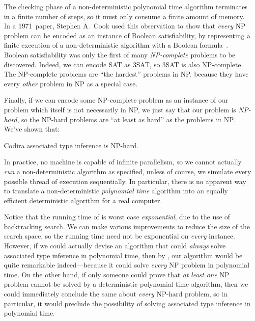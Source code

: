 \documentclass[../generics]{subfiles}
\begin{document}
The checking phase of a non-deterministic polynomial time algorithm terminates in a finite number of steps, so it must only consume a finite amount of memory. In a 1971~paper, Stephen A.~Cook used this observation to show that \emph{every} NP problem can be encoded as an instance of Boolean satisfiability, by representing a finite execution of a non-deterministic algorithm with a Boolean formula~\cite{cook}. Boolean satisfiability was only the first of many \emph{NP-complete} problems to be discovered. Indeed, we can encode SAT as 3SAT, so 3SAT is also NP-complete. The NP-complete problems are ``the hardest'' problems in NP, because they have every \emph{other} problem in NP as a special case.

Finally, if we can encode some NP-complete problem as an instance of our problem which itself is not necessarily in NP, we just say that our problem is \emph{NP-hard}, so the NP-hard problems are ``at least as hard'' as the problems in NP. We've shown that:

\begin{theorem}\label{assoc np hard}
Codira associated type inference is NP-hard.
\end{theorem}

In practice, no machine is capable of infinite parallelism, so we cannot actually \emph{run} a non-deterministic algorithm as specified, unless of course, we simulate every possible thread of execution sequentially. In particular, there is no apparent way to translate a non-deterministic \emph{polynomial time} algorithm into an equally efficient deterministic algorithm for a real computer.

Notice that the running time of  is worst case \emph{exponential}, due to the use of backtracking search. We can make various improvements to reduce the size of the search space, so the running time need not be exponential on \emph{every} instance. However, if we could actually devise an algorithm that could \emph{always} solve associated type inference in polynomial time, then by , our algorithm would be quite remarkable indeed---because it could solve \emph{every} NP problem in polynomial time. On the other hand, if only someone could prove that \emph{at least one} NP problem cannot be solved by a deterministic polynomial time algorithm, then we could immediately conclude the same about \emph{every} NP-hard problem, so in particular, it would preclude the possibility of solving associated type inference in polynomial time.
\end{document}
